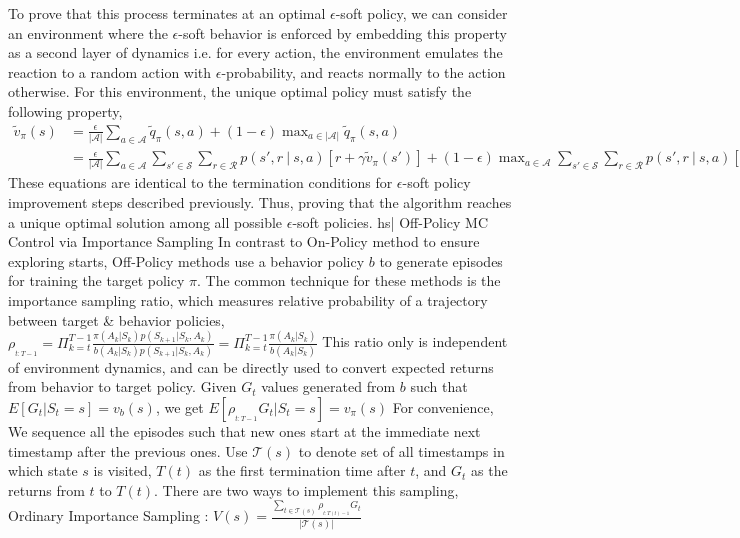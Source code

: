 To prove that this process terminates at an optimal \( \epsilon \)-soft policy, we can consider an environment where the \( \epsilon \)-soft behavior is enforced by embedding this property as a second layer of dynamics i.e. for every action, the environment emulates the reaction to a random action with \( \epsilon \)-probability, and reacts normally to the action otherwise. For this environment, the unique optimal policy must satisfy the following property,
\( \begin{aligned} \tilde{v}_\pi(s) &= \frac{\epsilon}{|\mathcal{A}|} \sum_{a \in \mathcal{A}} \tilde{q}_\pi(s, a) + (1 - \epsilon) \max_{a \in |\mathcal{A}|} \tilde{q}_\pi(s, a) \\ &= \frac{\epsilon}{|\mathcal{A}|} \sum_{a \in \mathcal{A}} \sum_{ s' \in \mathcal{S}} \sum_{r \in {\mathcal{R}}} p(s', r \ | \ s, a) [r + \gamma \tilde{v}_\pi(s')] + (1 - \epsilon) \max_{a \in \mathcal{A}} \sum_{s' \in \mathcal{S}} \sum_{r \in \mathcal{R}} p(s', r \ | \ s, a) [r + \gamma\tilde{v}_\pi(s')] \end{aligned} \)
These equations are identical to the termination conditions for \( \epsilon \)-soft policy improvement steps described previously. Thus, proving that the algorithm reaches a unique optimal solution among all possible \( \epsilon \)-soft policies.
hs| Off-Policy MC Control via Importance Sampling
In contrast to On-Policy method to ensure exploring starts, Off-Policy methods use a behavior policy \( b \) to generate episodes for training the target policy \( \pi \). The common technique for these methods is the importance sampling ratio, which measures relative probability of a trajectory between target & behavior policies,
\( \rho_{_{t:T-1}} = \Pi_{k=t}^{T-1}\frac{\pi(A_k | S_k) p(S_{k+1} | S_k, A_k)}{b(A_k | S_k) p(S_{k+1} | S_k, A_k)} = \Pi_{k=t}^{T-1} \frac{\pi(A_k | S_k)}{b(A_k | S_k)} \)
This ratio only is independent of environment dynamics, and can be directly used to convert expected returns from behavior to target policy.
Given \( G_t \) values generated from \( b \) such that \( E[G_t| S_t=s] = v_b(s) \), we get \( E[\rho_{_{t:T-1}} G_t | S_t = s] = v_\pi(s) \)
For convenience, We sequence all the episodes such that new ones start at the immediate next timestamp after the previous ones. Use \( \mathcal{T}(s) \) to denote set of all timestamps in which state \( s \) is visited, \( T(t) \) as the first termination time after \( t \), and \( G_t \) as the returns from \( t \) to \( T(t) \). There are two ways to implement this sampling,
Ordinary Importance Sampling : \( V(s) = \frac{\sum_{t \in \mathcal{T}(s)} \rho_{_{t:T(t) - 1}} G_t}{| \mathcal{T}(s) |} \)
